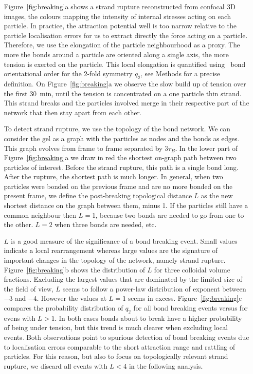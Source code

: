 Figure~\ref{fig:breaking}a shows a strand rupture reconstructed from confocal 3D images, the colours mapping the intensity of internal stresses acting on each particle. In practice, the attraction potential well is too narrow relative to the particle localisation errors for us to extract directly the force acting on a particle. Therefore, we use the elongation of the particle neighbourhood as a proxy. The more the bonds around a particle are oriented along a single axis, the more tension is exerted on the particle. This local elongation is quantified using~\cite{steinhardt1983boo} bond orientational order for the 2-fold symmetry $q_2$, see Methods for a precise definition. On Figure~\ref{fig:breaking}a we observe the slow build up of tension over the first \SI{30}{\minute}, until the tension is concentrated on a one particle thin strand. This strand breaks and the particles involved merge in their respective part of the network that then stay apart from each other.

To detect strand rupture, we use the topology of the bond network. We can consider the gel as a graph with the particles as nodes and the bonds as edges. This graph evolves from frame to frame separated by $3\tau_B$. In the lower part of Figure~\ref{fig:breaking}a we draw in red the shortest on-graph path between two particles of interest. Before the strand rupture, this path is a single bond long. After the rupture, the shortest path is much longer. In general, when two particles were bonded on the previous frame and are no more bonded on the present frame, we define the post-breaking topological distance $L$ as the new shortest distance on the graph between them, minus 1. If the particles still have a common neighbour then $L=1$, because two bonds are needed to go from one to the other. $L=2$ when three bonds are needed, etc.

$L$ is a good measure of the significance of a bond breaking event. Small values indicate a local rearrangement whereas large values are the signature of important changes in the topology of the network, namely strand rupture. Figure~\ref{fig:breaking}b shows the distribution of $L$ for three colloidal volume fractions. Excluding the largest values that are dominated by the limited size of the field of view, $L$ seems to follow a power-law distribution of exponent between $-3$ and $-4$. However the values at $L=1$ seems in excess. Figure~\ref{fig:breaking}c compares the probability distribution of $q_2$ for all bond breaking events versus for evens with $L>1$. In both cases bonds about to break have a higher probability of being under tension, but this trend is much clearer when excluding local events. Both observations point to spurious detection of bond breaking events due to localisation errors comparable to the short attraction range and rattling of particles. For this reason, but also to focus on topologically relevant strand rupture, we discard all events with $L<4$ in the following analysis.

